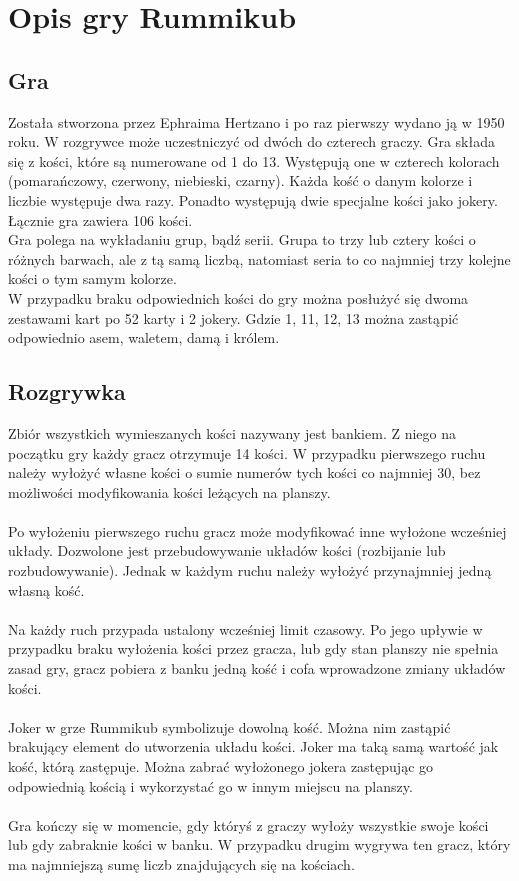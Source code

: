 \chapter{Opis gry Rummikub}
\thispagestyle{chapterBeginStyle}
\label{rozdzial1}

\section{Gra}

Została stworzona przez Ephraima Hertzano i po raz pierwszy wydano ją w 1950 roku. W rozgrywce może uczestniczyć od dwóch do czterech graczy. Gra składa się z kości, które są numerowane od 1 do 13. Występują one w czterech kolorach (pomarańczowy, czerwony, niebieski, czarny). Każda kość o danym kolorze i liczbie występuje dwa razy. Ponadto występują dwie specjalne kości jako jokery. Łącznie gra zawiera 106 kości. \\

Gra polega na wykładaniu grup, bądź serii. Grupa to trzy lub cztery kości o różnych barwach, ale z tą samą liczbą, natomiast seria to co najmniej trzy kolejne kości o tym samym kolorze. \\

W przypadku braku odpowiednich kości do gry można posłużyć się dwoma zestawami kart po 52 karty i 2 jokery. Gdzie 1, 11, 12, 13 można zastąpić odpowiednio asem, waletem, damą i królem.

\section{Rozgrywka}

Zbiór wszystkich wymieszanych kości nazywany jest bankiem. Z niego na początku gry każdy gracz otrzymuje 14 kości. W przypadku pierwszego ruchu należy wyłożyć własne kości o sumie numerów tych kości co najmniej 30, bez możliwości modyfikowania kości leżących na planszy. \\ \\
Po wyłożeniu pierwszego ruchu gracz może modyfikować inne wyłożone wcześniej układy. Dozwolone jest przebudowywanie układów kości (rozbijanie lub rozbudowywanie). Jednak w każdym ruchu należy wyłożyć przynajmniej jedną własną kość. \\ \\
Na każdy ruch przypada ustalony wcześniej limit czasowy. Po jego upływie w przypadku braku wyłożenia kości przez gracza, lub gdy stan planszy nie spełnia zasad gry, gracz pobiera z banku jedną kość i cofa wprowadzone zmiany układów kości. \\ \\
Joker w grze Rummikub symbolizuje dowolną kość. Można nim zastąpić brakujący element do utworzenia układu kości. Joker ma taką samą wartość jak kość, którą zastępuje. Można zabrać wyłożonego jokera zastępując go odpowiednią kością i wykorzystać go w innym miejscu na planszy. \\ \\
Gra kończy się w momencie, gdy któryś z graczy wyłoży wszystkie swoje kości lub gdy zabraknie kości w banku. W przypadku drugim wygrywa ten gracz, który ma najmniejszą sumę liczb znajdujących się na kościach.


